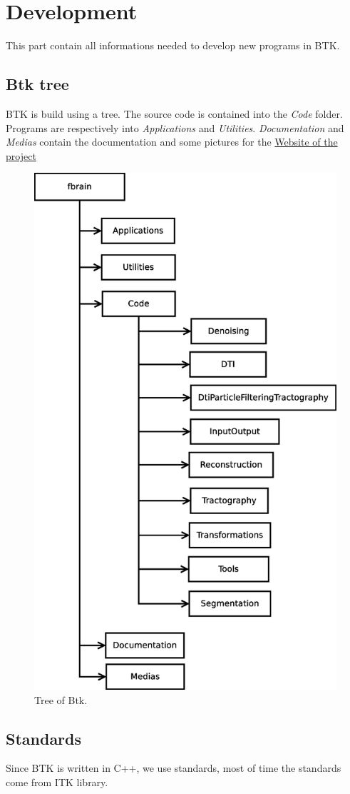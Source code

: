     \section{Development}
    This part contain all informations needed to develop new programs in BTK.

    \subsection{Btk tree}
    BTK is build using a tree.
    The source code is contained into the \textit{Code} folder.
    Programs are respectively into \textit{Applications} and \textit{Utilities}.
    \textit{Documentation} and \textit{Medias} contain the documentation and some pictures for the \href{http://rousseau.github.com/fbrain/}{Website of the project}

    \begin{figure}[H]
     \centering
      \includegraphics[height=0.5\textwidth]{Btk_tree.eps}
      \caption{Tree of Btk.}
    \end{figure}

    \subsection{Standards}
    Since BTK is written in C++, we use standards, most of time the standards come from ITK library.\\

